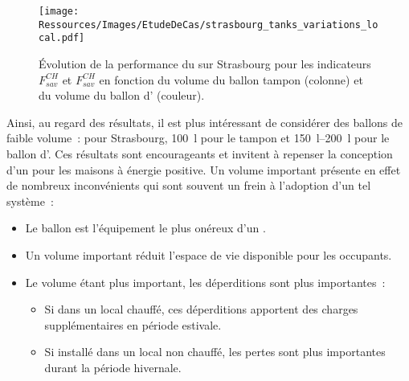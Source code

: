 \begin{figure}
    \centering
    \texttt{[image: Ressources/Images/EtudeDeCas/strasbourg\_tanks\_variations\_local.pdf]}
    \caption[Performance du  sur Strasbourg en fonction du volume des ballons]
             {Évolution de la performance du  sur Strasbourg pour les indicateurs $F_{sav}^{CH}$
              et $F_{sav}^{CH}$ en fonction du volume du ballon tampon (colonne) et
              du volume du ballon d’ (couleur).}
    \label{fig:tanks_variations_locales_strasbourg}
\end{figure}

Ainsi, au regard des résultats, il est plus intéressant de considérer des ballons
de faible volume~: pour Strasbourg, \SI{100}{\litre} pour le tampon et \SIrange{150}{200}{\litre} pour le ballon d’.
Ces résultats sont encourageants et invitent à repenser la conception d’un  pour
les maisons à énergie positive.
Un volume important présente en effet de nombreux inconvénients qui sont souvent un frein
à l’adoption d’un tel système~:
\begin{itemize}
    \item Le ballon est l’équipement le plus onéreux d’un .
    \item Un volume important réduit l’espace de vie disponible pour les occupants.
    \item Le volume étant plus important, les déperditions sont plus importantes~:
    \begin{itemize}
        \item Si dans un local chauffé, ces déperditions apportent des charges supplémentaires
              en période estivale.
        \item Si installé dans un local non chauffé, les pertes sont plus importantes
              durant la période hivernale.
    \end{itemize}
\end{itemize}


